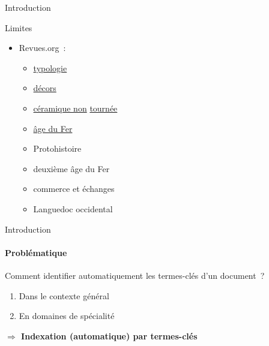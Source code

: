 \begin{frame}{Introduction}
\begin{alertblock}{Limites}
\begin{itemize}
\begin{itemize}
\begin{multicols}{3}
\begin{itemize}
            \item{habitat}
            \item{site fortifié}
            \item{identification}
            \item{étude du matériel}
          \end{itemize}
        \end{multicols}
        \vspace{-.75em}
        \item{Revues.org~:}
        \vspace{-1em}
        \begin{multicols}{3}
          \begin{itemize}
            \item{\underline{typologie}}
            \item{\underline{décors}}
            \item{\underline{céramique non} \underline{tournée}}
            \item{\underline{âge du Fer}}
            \item{Protohistoire}
            \item{deuxième âge du Fer}
            \item{commerce et échanges}
            \item{Languedoc occidental}
          \end{itemize}
        \end{multicols}
        \vspace{-.75em}
      \end{itemize}
    \end{itemize}
  \end{alertblock}
\end{frame}

\begin{frame}{Introduction}\framesubtitle{Problématique}
  Comment identifier automatiquement les termes-clés d'un document~?
  \begin{enumerate}
    \item{Dans le contexte général}
    \item{En domaines de spécialité}
  \end{enumerate}

  \vspace{1em}

  \large\textbf{$\Rightarrow$ Indexation (automatique) par termes-clés}
\end{frame}

